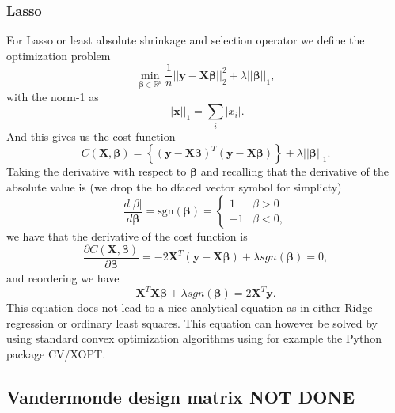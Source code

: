 \subsubsection{Lasso}
For Lasso or least absolute shrinkage and selection operator we define the optimization problem
$$
{\displaystyle \min_{\boldsymbol{\beta}\in
{\mathbb{R}}^{p}}}\frac{1}{n}\vert\vert \boldsymbol{y}-\boldsymbol{X}\boldsymbol{\beta}\vert\vert_2^2+\lambda\vert\vert \boldsymbol{\beta}\vert\vert_1,
$$
with the norm-1 as
$$
\vert\vert \boldsymbol{x}\vert\vert_1 = \sum_i \vert x_i\vert.
$$
And this gives us the cost function 
$$
C(\boldsymbol{X},\boldsymbol{\beta})=\left\{(\boldsymbol{y}-\boldsymbol{X}\boldsymbol{\beta})^T(\boldsymbol{y}-\boldsymbol{X}\boldsymbol{\beta})\right\}+\lambda\vert\vert\boldsymbol{\beta}\vert\vert_1.
$$
Taking the derivative with respect to $\boldsymbol{\beta}$ and recalling that the derivative of the absolute value is (we drop the boldfaced vector symbol for simplicty)
$$
\frac{d \vert \beta\vert}{d \boldsymbol{\beta}}=\mathrm{sgn}(\boldsymbol{\beta})=\left\{\begin{array}{cc} 1 & \beta > 0 \\-1 & \beta < 0, \end{array}\right.
$$
we have that the derivative of the cost function is
$$
\frac{\partial C(\boldsymbol{X},\boldsymbol{\beta})}{\partial \boldsymbol{\beta}}=-2\boldsymbol{X}^T(\boldsymbol{y}-\boldsymbol{X}\boldsymbol{\beta})+\lambda sgn(\boldsymbol{\beta})=0,
$$
and reordering we have
$$
\boldsymbol{X}^T\boldsymbol{X}\boldsymbol{\beta}+\lambda sgn(\boldsymbol{\beta})=2\boldsymbol{X}^T\boldsymbol{y}.
$$
This equation does not lead to a nice analytical equation as in either Ridge regression or ordinary least squares. This equation can however be solved by using standard convex optimization algorithms using for example the Python package CV\slash XOPT.


\subsection{Vandermonde design matrix NOT DONE}
%


